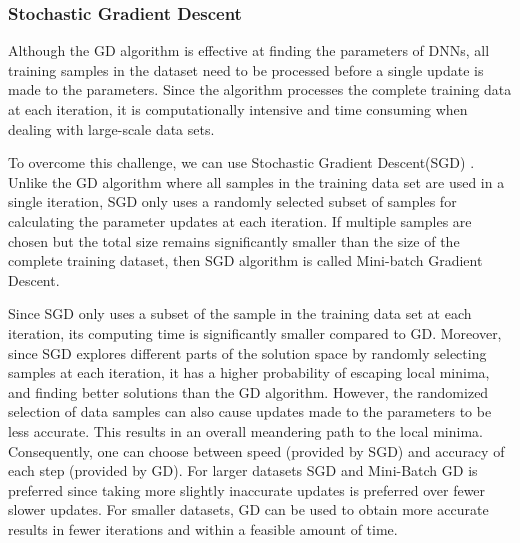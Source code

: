 \documentclass[letterpaper]{article}
\begin{document}
\begin{flushleft}
{%
\subsubsection{Stochastic Gradient Descent}

Although the GD algorithm is effective at finding the parameters of DNNs, all  training samples in the dataset need to be processed
before a single update is made to the parameters. Since the algorithm processes the complete training data at each iteration, 
it is computationally intensive and time consuming when dealing with large-scale data sets. 


To overcome this challenge, we can use Stochastic Gradient Descent(SGD) \cite{bottou2010large}. 
Unlike the GD algorithm where all samples in the training data set are used in a single iteration, SGD only uses a randomly
selected subset of samples for calculating the parameter updates at each iteration. 
If multiple samples are chosen but the total size remains significantly smaller than the size of the complete
training dataset, then SGD algorithm is called Mini-batch Gradient Descent.


Since SGD only uses a subset of the sample in the training data set at each iteration, its computing time is
significantly smaller compared to GD.  Moreover, since SGD explores different parts of the solution space by randomly selecting samples
at each iteration, it has a higher probability of escaping local minima, and finding better solutions than the GD algorithm. 
However, the randomized selection of data samples can also cause updates made to the parameters to be less accurate. This results in an
overall meandering path to the local minima. Consequently, one can choose between speed (provided by SGD) and accuracy of each step 
(provided by GD). For larger datasets SGD and Mini-Batch GD is preferred since taking more slightly inaccurate updates is preferred
over fewer slower updates. For smaller datasets, GD can be used to obtain more accurate results in fewer iterations and
within a feasible amount of time. 

}
\end{flushleft}
\end{document}
